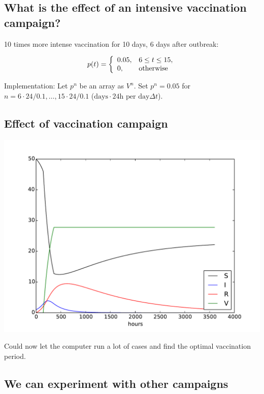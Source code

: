 \documentclass[%
twoside,                 %
final,                   %
10pt]{article}
\begin{document}
\subsection{What is the effect of an intensive vaccination campaign?}

10 times more intense vaccination for 10 days, 6 days after outbreak:

\begin{equation*} p(t) = \left\lbrace\begin{array}{ll}
0.05,& 6\leq t\leq 15,\\
0,& \hbox{otherwise} \end{array}\right.\end{equation*}

Implementation: Let $p^n$ be an array as $V^n$. Set $p^n=0.05$ for
$n=6\cdot 24/0.1,\ldots, 15\cdot 24/0.1$ ($\mbox{days}\cdot 24 \mbox{h per
day}\Delta t$).

\subsection{Effect of vaccination campaign}


\begin{center}  %
  \centerline{\includegraphics[width=0.8\linewidth]{fig/SIRV2.pdf}}
\end{center}


Could now let the computer run a lot of cases and find the optimal
vaccination period.

\subsection{We can experiment with other campaigns}
\end{document}
